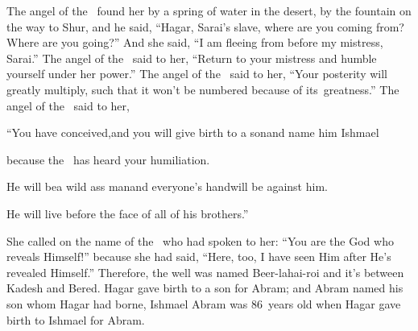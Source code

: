 \begin{inparaenum}
   The angel of the \lord\ found her by a spring of water in the desert, by the fountain on the way to Shur,%
   and he said, ``Hagar, Sarai's slave, where are you coming from? Where are you going?'' And she said, ``I am fleeing from before my mistress, Sarai.''%
   The angel of the \lord\ said to her, ``Return to your mistress and humble yourself under her power.'' %
   The angel of the \lord\ said to her, ``Your posterity will greatly multiply, such that it won't be numbered because of its\understood\ greatness.''%
   The angel of the \lord\ said to her,%
  
  \pc ``You have conceived,\pa and you will give birth to a son\pa and name him Ishmael%
  
  \pc because the \lord\ has heard your humiliation.%
  
  \pb {} He will be\pa a wild ass%
  man\pa and everyone's hand\pa will be against him.%
  
  \pc He will live before the face of all of his brothers.''\smallskip%
  
  \noindent{} She called on the name of the \lord\ who had spoken to her: ``You are the God who reveals Himself!'' because she had said, ``Here, too, I have seen Him after He's revealed Himself.''%
   Therefore, the well was named Beer-lahai-roi and it's between Kadesh and Bered.%
   Hagar gave birth to a son for Abram; and Abram named his son whom Hagar had borne, Ishmael%
   Abram was 86~years old when Hagar gave birth to Ishmael for Abram.%
\end{inparaenum}
